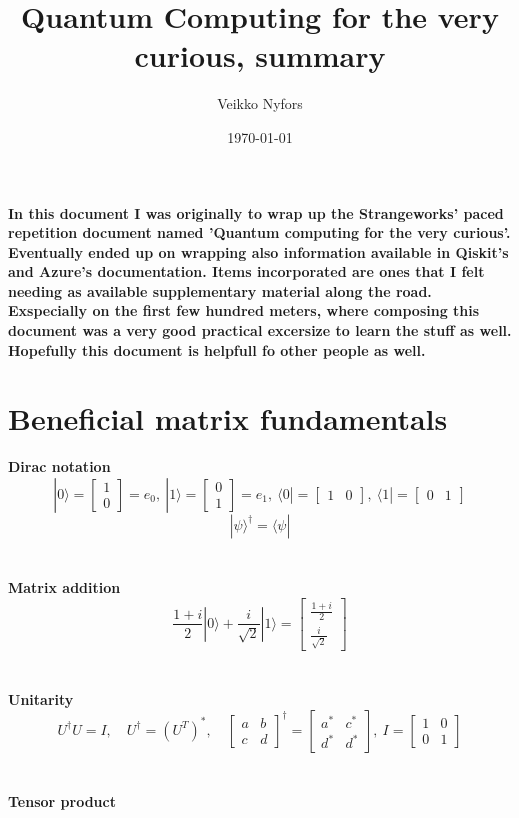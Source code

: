 \documentclass[11pt, fleqn]{article}
\title{Quantum Computing for the very curious, summary}
\author{Veikko Nyfors}
\date{\today}
\begin{document}
\maketitle

\paragraph{In this document I was originally to wrap up the Strangeworks' paced repetition document named 'Quantum computing for the very curious'.
Eventually ended up on wrapping also information available in Qiskit's and Azure's documentation.
Items incorporated are ones that I felt needing as available supplementary material along the road.
Exspecially on the first few hundred meters, where composing this document was a very good practical excersize to learn the stuff as well.
\\
Hopefully this document is helpfull fo other people as well. 
}


\newpage

\section{Beneficial matrix fundamentals}

\bf{Dirac notation}
\[|0\rangle=\begin{bmatrix} 1\\0\end{bmatrix}=e_0,\:
|1\rangle=\begin{bmatrix} 0\\1\end{bmatrix}=e_1,\:
\langle0|=\begin{bmatrix} 1&0\end{bmatrix},\:\langle1|=\begin{bmatrix} 0&1\end{bmatrix}\]
\[|\psi\rangle^\dagger=\langle\psi|\]
\\~\\
\bf{Matrix addition}
\[\frac{1+i}{2}|0\rangle + \frac{i}{\sqrt{2}}|1\rangle = \begin{bmatrix} \frac{1+i}{2}\\\frac{i}{\sqrt{2}} \end{bmatrix}\]
\\~\\
\bf{Unitarity}
\[U^\dagger U=I,\quad U^\dagger=(U^T)^*,\quad
\begin{bmatrix}a & b\\c & d\end{bmatrix}^\dagger=\begin{bmatrix}a^* & c^*\\d^* & d^*\end{bmatrix},\:I=\begin{bmatrix}1&0\\0&1\end{bmatrix}\]
\\~\\
\bf{Tensor product\\}
\end{document}
